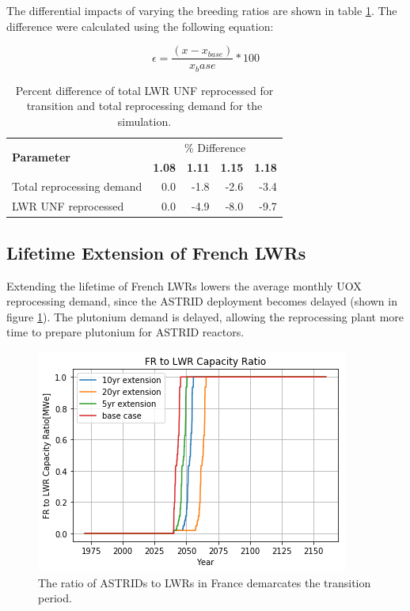 The differential impacts of varying the breeding ratios are
shown in table \ref{tab:br_diff}. The difference were calculated
using the following equation:

\[ \epsilon = \frac{(x - x_{base})}{x_base} * 100 \]

\begin{table}[h]
	\centering
	\caption{Percent difference of total \gls{LWR} \gls{UNF} reprocessed
		for transition and total reprocessing demand for the simulation.}
	\begin{tabular}{lrrrr}
		\hline
		\multirow{2}{*}{\textbf{Parameter}} & \multicolumn{4}{c}{\% Difference} \\
		 & \textbf{1.08}& \textbf{1.11} & \textbf{1.15} & \textbf{1.18} \\
		\hline
		Total reprocessing demand & 0.0 & -1.8 & -2.6 & -3.4 \\ 
		\gls{LWR} \gls{UNF} reprocessed & 0.0  & -4.9 & -8.0 & -9.7 \\
		\hline
	\end{tabular}
	\label{tab:br_diff}
\end{table}


\subsection{Lifetime Extension of French \glspl{LWR}}\label{sec:life}
Extending the lifetime of French \glspl{LWR} lowers the average
monthly \gls{UOX} reprocessing demand, since the \gls{ASTRID} deployment becomes 
delayed (shown in figure \ref{fig:pow_diff}). The plutonium demand is delayed,
 allowing the reprocessing plant more time to prepare plutonium for \gls{ASTRID} reactors.

\begin{figure}[htbp!]
    \begin{center}
        \includegraphics[scale=0.7]{./images/sensitivity/pow_ratio.png}
    \end{center}
    \caption{The ratio of \glspl{ASTRID} to \glspl{LWR} in France demarcates 
    the transition period.}
    \label{fig:pow_diff}
\end{figure}

